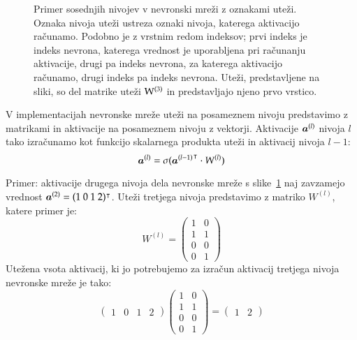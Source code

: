 \begin{figure}
\caption{Primer sosednjih nivojev v nevronski mreži z oznakami uteži. Oznaka nivoja uteži ustreza oznaki nivoja, katerega aktivacijo računamo. Podobno je z vrstnim redom indeksov; prvi indeks je indeks nevrona, katerega vrednost je uporabljena pri računanju aktivacije, drugi pa indeks nevrona, za katerega aktivacijo računamo, drugi indeks pa indeks nevrona. Uteži, predstavljene na sliki, so del matrike uteži ${\rm W}^{(3)}$ in predstavljajo njeno prvo vrstico.}
\label{f-nn-utezi}
\end{figure}

V implementacijah nevronske mreže uteži na posameznem nivoju predstavimo z matrikami in aktivacije na posameznem nivoju z vektorji. Aktivacije $\boldsymbol{a}^{(l)}$ nivoja $l$ tako izračunamo kot funkcijo skalarnega produkta uteži in aktivacij nivoja $l-1$:
\begin{equation}
\boldsymbol{a}^{(l)} = \sigma({\boldsymbol{a}^{(l-1)}}^{\intercal} \cdot W^{(l)} )
\end{equation}

\noindent Primer: aktivacije drugega nivoja dela nevronske mreže s slike~\ref{f-nn-utezi} naj zavzamejo vrednost $\boldsymbol{a}^{(2)}=(1\ 0\ 1\ 2)^{\intercal}$. Uteži tretjega nivoja predstavimo z matriko $W^{(l)}$, katere primer je:
\[
W^{(l)} = \begin{pmatrix} 1 & 0 \\ 1 & 1 \\ 0 & 0 \\ 0 & 1 \end{pmatrix}
\]
\noindent Utežena vsota aktivacij, ki jo potrebujemo za izračun aktivacij tretjega nivoja nevronske mreže je tako:
\[
\begin{pmatrix}1 & 0 & 1 & 2\end{pmatrix}
\begin{pmatrix} 1 & 0 \\ 1 & 1 \\ 0 & 0 \\ 0 & 1 \end{pmatrix} = 
\begin{pmatrix}1 & 2\end{pmatrix}      %
\]

